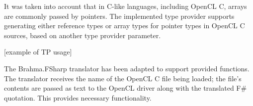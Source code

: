 It was taken into account that in C-like languages, including OpenCL C, arrays are commonly passed by pointers. The implemented type provider supports generating either reference types or array types for pointer types in OpenCL C sources, based on another type provider parameter.

[example of TP usage]

The Brahma.FSharp translator has been adapted to support provided functions. The translator receives the name of the OpenCL C file being loaded; the file's contents are passed as text to the OpenCL driver along with the translated F# quotation. This provides necessary functionality.
